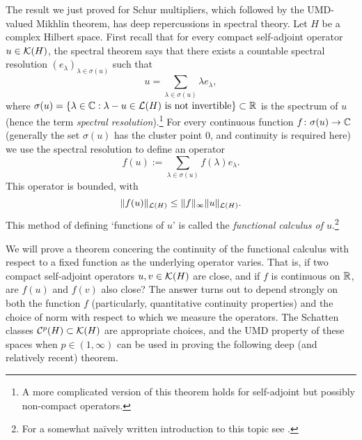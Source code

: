 The result we just proved for Schur multipliers, which followed by the UMD-valued Mikhlin theorem, has deep repercussions in spectral theory.
Let $H$ be a complex Hilbert space.
First recall that for every compact self-adjoint operator $u \in \mathcal{K}(H)$, the spectral theorem says that there exists a countable spectral resolution $(e_{\lambda})_{\lambda \in \sigma(u)}$ such that
\begin{equation}\label{eq:u-res}
  u = \sum_{\lambda \in \sigma(u)} \lambda e_{\lambda},
\end{equation}
where $\sigma(u) = \{\lambda \in \mathbb{C} : \text{$\lambda - u \in \mathcal{L}(H)$ is not invertible}\} \subset \mathbb{R}$ is the spectrum of $u$ (hence the term \emph{spectral resolution}).\footnote{A more complicated version of this theorem holds for self-adjoint but possibly non-compact operators.}
For every continuous function $f \colon \sigma(u) \rightarrow \mathbb{C}$ (generally the set $\sigma(u)$ has the cluster point $0$, and continuity is required here) we use the spectral resolution to define an operator
\begin{equation}\label{eq:fu}
  f(u) := \sum_{\lambda \in \sigma(u)} f(\lambda) e_{\lambda}.
\end{equation}
This operator is bounded, with
\begin{equation*}
  \|f(u)\|_{\mathcal{L}(H)} \leq \|f\|_{\infty} \|u\|_{\mathcal{L}(H)}.
\end{equation*}
This method of defining `functions of $u$' is called the \emph{functional calculus of $u$}.\footnote{For a somewhat na\"ively written introduction to this topic see \cite{AA-FC}.}

We will prove a theorem concering the continuity of the functional calculus with respect to a fixed function as the underlying operator varies.
That is, if two compact self-adjoint operators $u,v \in \mathcal{K}(H)$ are close, and if $f$ is continuous on $\mathbb{R}$, are $f(u)$ and $f(v)$ also close?
The answer turns out to depend strongly on both the function $f$ (particularly, quantitative continuity properties) and the choice of norm with respect to which we measure the operators.
The Schatten classes $\mathcal{C}^{p}(H) \subset \mathcal{K}(H)$ are appropriate choices, and the UMD property of these spaces when $p \in (1,\infty)$ can be used in proving the following deep (and relatively recent) theorem.

